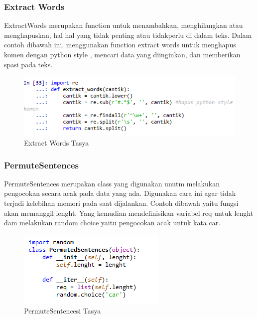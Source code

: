 \subsubsection{Extract Words}
ExtractWords merupakan function untuk menambahkan, menghilangkan atau menghapuskan, hal hal yang tidak penting atau tidakperlu di dalam teks. Dalam contoh dibawah ini. menggunakan function extract words untuk menghapus komen dengan python style , mencari data yang diinginkan, dan memberikan spasi pada teks.
\begin{figure}[ht]
\centering
\includegraphics[scale=0.3]{figures/chapter5tasya15.png}
\caption{Extract Words Tasya}
\label{Praktek}
\end{figure}

\subsubsection{PermuteSentences}
PermuteSentences merupakan class yang digunakan unutm melakukan pengocokan secara acak pada data yang ada. Digunakan cara ini agar tidak terjadi kelebihan memori pada saat dijalankan. Contoh dibawah yaitu fungsi akan memanggil lenght. Yang kemudian mendefinisikan variabel req untuk lenght dam melakukan random choice yaitu pengocokan acak untuk kata car.
\begin{figure}[ht]
\centering
\includegraphics[scale=0.3]{figures/chapter5tasya16.png}
\caption{PermuteSentencesi Tasya}
\label{Praktek}
\end{figure}








